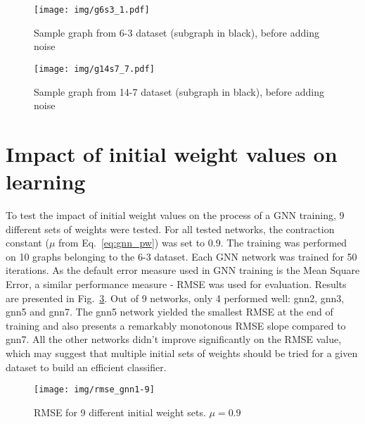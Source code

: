 \begin{figure}[h!]
\begin{center}
	\texttt{[image: img/g6s3\_1.pdf]}
	\caption{Sample graph from 6-3 dataset (subgraph in black), before adding noise}
	\label{fig:gnn_g6s3}
\end{center}
\end{figure}

\begin{figure}[h!]
\begin{center}
	\texttt{[image: img/g14s7\_7.pdf]}
	\caption{Sample graph from 14-7 dataset (subgraph in black), before adding noise}
	\label{fig:gnn_g6s3}
\end{center}
\end{figure}

\newpage
\section{Impact of initial weight values on learning}
To test the impact of initial weight values on the process of a GNN training, 9 different sets of weights were tested. For all tested networks, the contraction constant ($\mu$ from Eq.~\ref{eq:gnn_pw}) was set to $0.9$. The training was performed on 10 graphs belonging to the 6-3 dataset. Each GNN network was trained for 50 iterations. As the default error measure used in GNN training is the Mean Square Error, a similar performance measure - RMSE was used for evaluation. Results are presented in Fig.~\ref{fig:gnn_multiple}. Out of 9 networks, only 4 performed well: gnn2, gnn3, gnn5 and gnn7. The gnn5 network yielded the smallest RMSE at the end of training and also presents a remarkably monotonous RMSE slope compared to gnn7. All the other networks didn't improve significantly on the RMSE value, which may suggest that multiple initial sets of weights should be tried for a given dataset to build an efficient classifier.

\begin{figure}[h!]
\begin{center}
	\texttt{[image: img/rmse\_gnn1-9]}
	\caption{RMSE for 9 different initial weight sets. $\mu = 0.9$}
	\label{fig:gnn_multiple}
\end{center}
\end{figure}

\newpage
